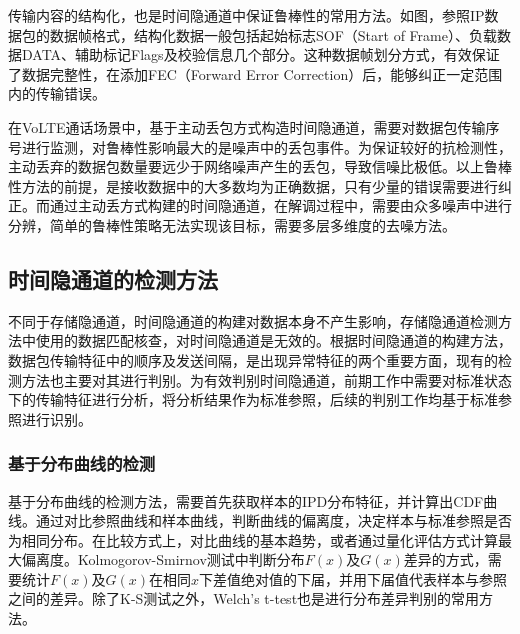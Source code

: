 传输内容的结构化，也是时间隐通道中保证鲁棒性的常用方法。如图，参照IP数据包的数据帧格式，结构化数据一般包括起始标志SOF（Start of Frame）、负载数据DATA、辅助标记Flags及校验信息几个部分。这种数据帧划分方式，有效保证了数据完整性，在添加FEC（Forward Error Correction）后，能够纠正一定范围内的传输错误。

在VoLTE通话场景中，基于主动丢包方式构造时间隐通道，需要对数据包传输序号进行监测，对鲁棒性影响最大的是噪声中的丢包事件。为保证较好的抗检测性，主动丢弃的数据包数量要远少于网络噪声产生的丢包，导致信噪比极低。以上鲁棒性方法的前提，是接收数据中的大多数均为正确数据，只有少量的错误需要进行纠正。而通过主动丢方式构建的时间隐通道，在解调过程中，需要由众多噪声中进行分辨，简单的鲁棒性策略无法实现该目标，需要多层多维度的去噪方法。

\subsection{时间隐通道的检测方法}
\label{sec:intro:background:detect}

不同于存储隐通道，时间隐通道的构建对数据本身不产生影响，存储隐通道检测方法中使用的数据匹配核查，对时间隐通道是无效的。根据时间隐通道的构建方法，数据包传输特征中的顺序及发送间隔，是出现异常特征的两个重要方面，现有的检测方法也主要对其进行判别。为有效判别时间隐通道，前期工作中需要对标准状态下的传输特征进行分析，将分析结果作为标准参照，后续的判别工作均基于标准参照进行识别。

\subsubsection{基于分布曲线的检测}
基于分布曲线的检测方法，需要首先获取样本的IPD分布特征，并计算出CDF曲线。通过对比参照曲线和样本曲线，判断曲线的偏离度，决定样本与标准参照是否为相同分布。在比较方式上，对比曲线的基本趋势，或者通过量化评估方式计算最大偏离度。Kolmogorov-Smirnov测试中判断分布$F(x)$及$G(x)$差异的方式，需要统计$F(x)$及$G(x)$在相同$x$下差值绝对值的下届，并用下届值代表样本与参照之间的差异。除了K-S测试之外，Welch’s t-test也是进行分布差异判别的常用方法。


